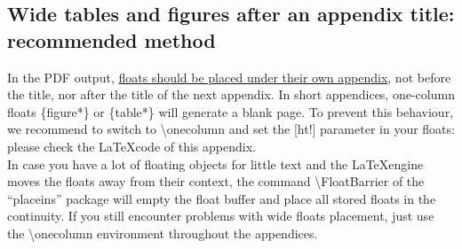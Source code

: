 \documentclass{aa}
\begin{document}
\begin{appendix}





\onecolumn
\section{Wide tables and figures after an appendix title: recommended method}
%

In the PDF output, \underline{floats should be placed
under their own appendix}, not before the title, nor after the
title of the next appendix. In short appendices, one-column floats
\{figure*\} or \{table*\} will generate
a blank page. To prevent this behaviour, we recommend to switch
to \textbackslash onecolumn and set the [ht!] parameter 
in your floats: please check the \LaTeX code of this appendix.\\

In case you have a lot of floating objects for little text and the 
\LaTeX engine moves the floats away from their context, the command
\textbackslash FloatBarrier of the “placeins” package will empty the
float buffer and place all stored floats in the continuity. If you still encounter problems with wide floats placement, just use the \textbackslash onecolumn
environment throughout the appendices.



\end{appendix}
\end{document}
